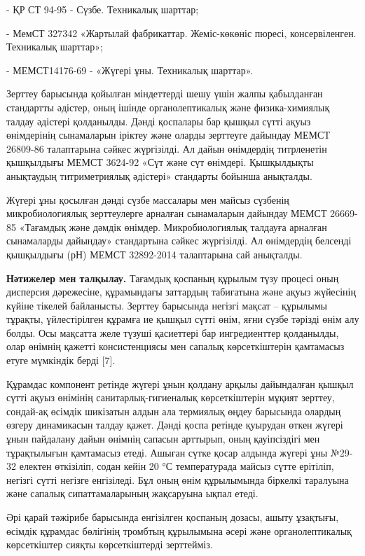 \begin{multicols}{2}
- ҚР СТ 94-95 - Сүзбе. Техникалық шарттар;

- МемСТ 327342 «Жартылай фабрикаттар. Жеміс-көкөніс пюресі,
консервіленген. Техникалық шарттар»;

- МЕМСТ14176-69 - «Жүгері ұны. Техникалық шарттар».

Зерттеу барысында қойылған міндеттерді шешу үшін жалпы қабылданған
стандартты әдістер, оның ішінде органолептикалық және физика-химиялық
талдау әдістері қолданылды. Дәнді қоспалары бар қышқыл сүтті ақуыз
өнімдерінің сынамаларын іріктеу және оларды зерттеуге дайындау МЕМСТ
26809-86 талаптарына сәйкес жүргізілді. Ал дайын өнімдердің титрленетін
қышқылдығы МЕМСТ 3624-92 «Сүт және сүт өнімдері. Қышқылдықты анықтаудың
титриметриялық әдістері» стандарты бойынша анықталды.

Жүгері ұны қосылған дәнді сүзбе массалары мен майсыз сүзбенің
микробиологиялық зерттеулерге арналған сынамаларын дайындау МЕМСТ
26669-85 «Тағамдық және дәмдік өнімдер. Микробиологиялық талдауға
арналған сынамаларды дайындау» стандартына сәйкес жүргізілді. Ал
өнімдердің белсенді қышқылдығы (рН) МЕМСТ 32892-2014 талаптарына сай
анықталды.

{\bfseries Нәтижелер мен талқылау.} Тағамдық қоспаның құрылым түзу процесі
оның дисперсия дәрежесіне, құрамындағы заттардың табиғатына және ақуыз
жүйесінің күйіне тікелей байланысты. Зерттеу барысында негізгі мақсат --
құрылымы тұрақты, үйлестірілген құрамға ие қышқыл сүтті өнім, яғни сүзбе
тәрізді өнім алу болды. Осы мақсатта желе түзуші қасиеттері бар
ингредиенттер қолданылды, олар өнімнің қажетті консистенциясы мен
сапалық көрсеткіштерін қамтамасыз етуге мүмкіндік берді {[}7{]}.

Құрамдас компонент ретінде жүгері ұнын қолдану арқылы дайындалған қышқыл
сүтті ақуыз өнімінің санитарлық-гигиеналық көрсеткіштерін мұқият
зерттеу, сондай-ақ өсімдік шикізатын алдын ала термиялық өңдеу барысында
олардың өзгеру динамикасын талдау қажет. Дәнді қоспа ретінде қуырудан
өткен жүгері ұнын пайдалану дайын өнімнің сапасын арттырып, оның
қауіпсіздігі мен тұрақтылығын қамтамасыз етеді. Ашыған сүтке қосар
алдында жүгері ұны №29-32 електен өткізіліп, содан кейін 20 °С
температурада майсыз сүтте ерітіліп, негізгі сүтті негізге енгізіледі.
Бұл оның өнім құрылымында біркелкі таралуына және сапалық
сипаттамаларының жақсаруына ықпал етеді.

Әрі қарай тәжірибе барысында енгізілген қоспаның дозасы, ашыту ұзақтығы,
өсімдік құрамдас бөлігінің тромбтың құрылымына әсері және
органолептикалық көрсеткіштер сияқты көрсеткіштерді зерттейміз.


\end{multicols}
